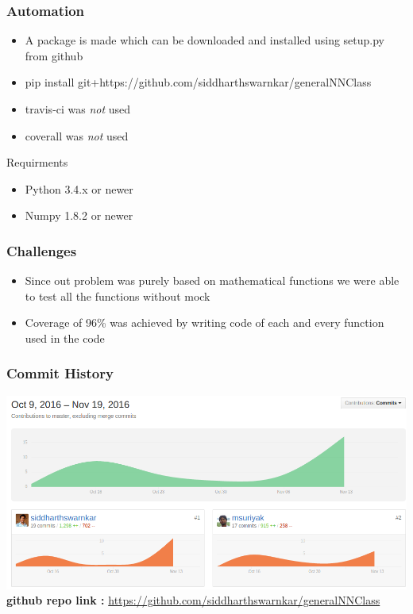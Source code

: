 \documentclass[10pt]{beamer}
\begin{document}
\begin{frame}
\frametitle{Automation}
\begin{block}{}
\begin{itemize}
\item{A package is made which can be downloaded and installed using setup.py from github}
\item{pip install git+https://github.com/siddharthswarnkar/generalNNClass}
\item{travis-ci was \emph{not} used}
\item{coverall was \emph{not} used}
\end{itemize}
\end{block}
\begin{block}{Requirments}
\begin{itemize}
\item{Python 3.4.x or newer}
\item{Numpy 1.8.2 or newer}
\end{itemize}
\end{block}
\end{frame}

\begin{frame}
\frametitle{Challenges}
\begin{itemize}
\item{Since out problem was purely based on mathematical functions we were able to test all the functions without mock}
\item{Coverage of 96\% was achieved by writing code of each and every function used in the code}
\end{itemize}
\end{frame}

\begin{frame}
\frametitle{Commit History}
\includegraphics[scale=0.3]{commits.png}
\vspace{5cm}
\textbf{github repo link :} 
\url{https://github.com/siddharthswarnkar/generalNNClass}

\end{frame} 
\end{document}
